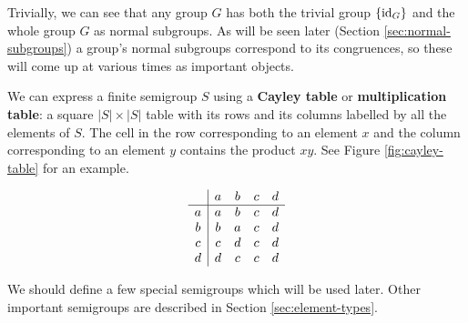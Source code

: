 Trivially, we can see that any group $G$ has both the trivial group $\{\operatorname{id}_G\}$
and the whole group $G$ as normal subgroups.  As will be seen later (Section
\ref{sec:normal-subgroups}) a group's normal subgroups correspond to its
congruences, so these will come up at various times as important objects.

\begin{definition}
  \label{def:cayley-table}
  We can express a finite semigroup $S$ using a \textbf{Cayley table} or
  \textbf{multiplication table}: a square $|S| \times |S|$ table with its rows
  and its columns labelled by all the elements of $S$.  The cell in the row
  corresponding to an element $x$ and the column corresponding to an element $y$
  contains the product $xy$.  See Figure \ref{fig:cayley-table} for an example.

  \begin{table}[h]
    \centering
    \renewcommand\arraystretch{1.2}
    $$
    \begin{array}{c | c c c c}
      & a & b & c & d \\
      \hline
      a & a & b & c & d \\
      b & b & a & c & d \\
      c & c & d & c & d \\
      d & d & c & c & d \\
    \end{array}
    $$
    \renewcommand\arraystretch{0.7}
    \caption{Cayley table of a semigroup with four elements}
    \label{fig:cayley-table}
  \end{table}
\end{definition}

We should define a few special semigroups which will be used later.  Other
important semigroups are described in Section \ref{sec:element-types}.


